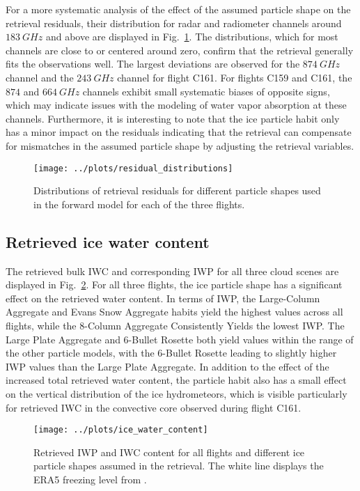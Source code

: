 \documentclass[journal abbreviation, manuscript]{copernicus}
\begin{document}
For a more systematic analysis of the effect of the assumed particle shape on
the retrieval residuals, their distribution for radar and radiometer channels
around $183\ \unit{GHz}$ and above are displayed in
Fig.~\ref{fig:residuals_box}. The distributions, which for most channels are
close to or centered around zero, confirm that the retrieval generally fits the
observations well. The largest deviations are observed for the $874\ \unit{GHz}$
channel and the $243\ \unit{GHz}$ channel for flight C161. For flights C159 and
C161, the $874$ and $664\ \unit{GHz}$ channels exhibit small systematic biases
of opposite signs, which may indicate issues with the modeling of water vapor
absorption at these channels. Furthermore, it is interesting to note that the
ice particle habit only has a minor impact on the residuals indicating that the
retrieval can compensate for mismatches in the assumed particle shape by
adjusting the retrieval variables.


\begin{figure}[!hbpt]
  \centering
  \texttt{[image: ../plots/residual\_distributions]}
  \caption{Distributions of retrieval residuals for different particle
    shapes used in the forward model for each of the three flights.}
  \label{fig:residuals_box}
\end{figure}

\subsection{Retrieved ice water content}

The retrieved bulk IWC and corresponding IWP for all three cloud scenes are
displayed in Fig.~\ref{fig:ice_water_content}. For all three flights, the ice
particle shape has a significant effect on the retrieved water content. In terms
of IWP, the Large-Column Aggregate and Evans Snow Aggregate habits yield the
highest values across all flights, while the 8-Column Aggregate Consistently
Yields the lowest IWP. The Large Plate Aggregate and 6-Bullet Rosette both yield
values within the range of the other particle models, with the 6-Bullet Rosette
leading to slightly higher IWP values than the Large Plate Aggregate. In
addition to the effect of the increased total retrieved water content, the
particle habit also has a small effect on the vertical distribution of the ice
hydrometeors, which is visible particularly for retrieved IWC in the convective
core observed during flight C161.


\begin{figure}[!hbpt]
  \centering
  \texttt{[image: ../plots/ice\_water\_content]}
  \caption{Retrieved IWP and IWC content for all flights and different ice
    particle shapes assumed in the retrieval. The white line displays the ERA5
    freezing level from \citet{era5}.
  }
  \label{fig:ice_water_content}
\end{figure}
\end{document}
